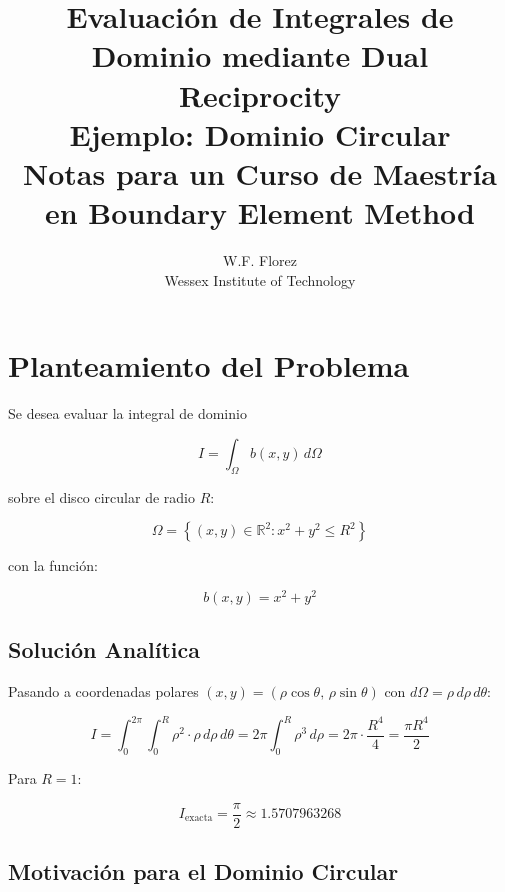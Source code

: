 \documentclass[12pt,a4paper]{article}
\title{\textbf{Evaluación de Integrales de Dominio mediante Dual Reciprocity}\\[0.5em]
\large Ejemplo: Dominio Circular\\[0.3em]
\normalsize Notas para un Curso de Maestría en Boundary Element Method}
\author{W.F. Florez\\
\small Wessex Institute of Technology}
\date{}
\begin{document}
\maketitle
\tableofcontents
\newpage

\section{Planteamiento del Problema}

Se desea evaluar la integral de dominio

\begin{equation}
    I = \int_\Omega b(x,y)\, d\Omega
\end{equation}

sobre el disco circular de radio $R$:

\begin{equation}
    \Omega = \left\{ (x,y) \in \mathbb{R}^2 : x^2 + y^2 \leq R^2 \right\}
\end{equation}

con la función:

\begin{equation}
    b(x,y) = x^2 + y^2
\end{equation}

\subsection{Solución Analítica}

Pasando a coordenadas polares $(x,y) = (\rho\cos\theta,\, \rho\sin\theta)$
con $d\Omega = \rho\,d\rho\,d\theta$:

\begin{equation}
    I = \int_0^{2\pi}\int_0^R \rho^2 \cdot \rho\, d\rho\, d\theta
      = 2\pi \int_0^R \rho^3\, d\rho
      = 2\pi \cdot \frac{R^4}{4}
      = \frac{\pi R^4}{2}
\end{equation}

Para $R = 1$:

\begin{equation}
    I_{\text{exacta}} = \frac{\pi}{2} \approx 1.5707963268
\end{equation}

\subsection{Motivación para el Dominio Circular}
\end{document}
